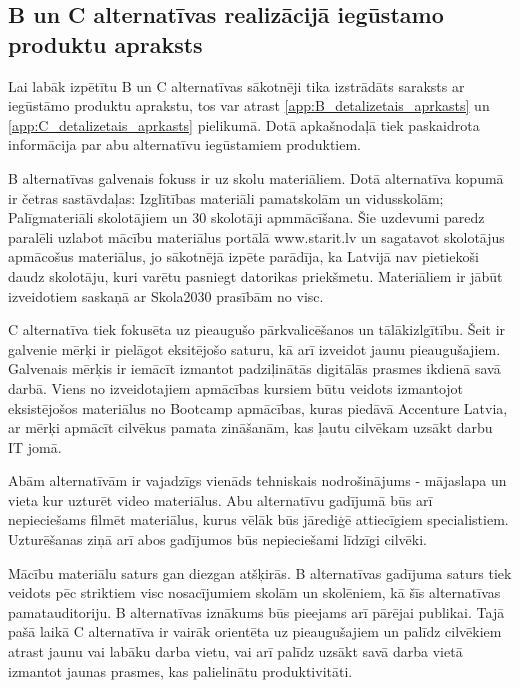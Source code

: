 \subsection{B un C alternatīvas realizācijā iegūstamo produktu apraksts}
Lai labāk izpētītu B un C alternatīvas sākotnēji tika izstrādāts saraksts ar iegūstāmo produktu
aprakstu, tos var atrast \ref{app:B_detalizetais_aprkasts} un \ref{app:C_detalizetais_aprkasts} pielikumā.
Dotā apkašnodaļā tiek paskaidrota informācija par abu alternatīvu iegūstamiem produktiem.
\par
B alternatīvas galvenais fokuss ir uz skolu materiāliem. Dotā alternatīva kopumā ir četras sastāvdaļas:
Izglītības materiāli pamatskolām un vidusskolām; Palīgmateriāli skolotājiem un 30 skolotāji apmmācīšana.
Šie uzdevumi paredz paralēli uzlabot mācību materiālus portālā www.starit.lv un sagatavot skolotājus
apmācošus materiālus, jo sākotnējā izpēte parādīja, ka Latvijā nav pietiekoši daudz skolotāju, kuri varētu
pasniegt datorikas priekšmetu. Materiāliem ir jābūt izveidotiem saskaņā ar Skola2030 prasībām no \acrshort{visc}.
\par
C alternatīva tiek fokusēta uz pieaugušo pārkvalicēšanos un tālākizlgītību. Šeit ir galvenie mērķi ir pielāgot
eksitējošo saturu, kā arī izveidot jaunu pieaugušajiem. Galvenais mērķis ir iemācīt izmantot padziļinātās 
digitālās prasmes ikdienā savā darbā. Viens no izveidotajiem apmācības kursiem būtu veidots izmantojot eksistējošos
materiālus no Bootcamp apmācības, kuras piedāvā Accenture Latvia, ar mērķi apmācīt cilvēkus pamata zināšanām, 
kas ļautu cilvēkam uzsākt darbu IT jomā. 
\par
Abām alternatīvām ir vajadzīgs vienāds tehniskais nodrošinājums - mājaslapa un vieta kur uzturēt video materiālus.
Abu alternatīvu gadījumā būs arī nepieciešams filmēt materiālus, kurus vēlāk būs jārediģē attiecīgiem specialistiem.
Uzturēšanas ziņā arī abos gadījumos būs nepieciešami līdzīgi cilvēki.
\par
Mācību materiālu saturs gan diezgan atšķirās. B alternatīvas gadījuma saturs tiek veidots pēc striktiem \acrshort{visc}
nosacījumiem skolām un skolēniem, kā šīs alternatīvas pamatauditoriju. B alternatīvas iznākums būs pieejams arī
pārējai publikai. Tajā pašā laikā C alternatīva ir vairāk orientēta uz pieaugušajiem un palīdz cilvēkiem atrast
jaunu vai labāku darba vietu, vai arī palīdz uzsākt savā darba vietā izmantot jaunas prasmes, kas palielinātu 
produktivitāti.
